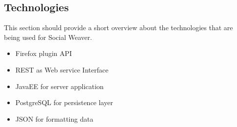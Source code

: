 \subsection{Technologies}

This section should provide a short overview about the technologies that are being used for Social Weaver. 

\begin{itemize}
\item Firefox plugin API
\item REST as Web service Interface
\item JavaEE for server application 
\item PostgreSQL for persistence layer
\item JSON for formatting data
\end{itemize}
